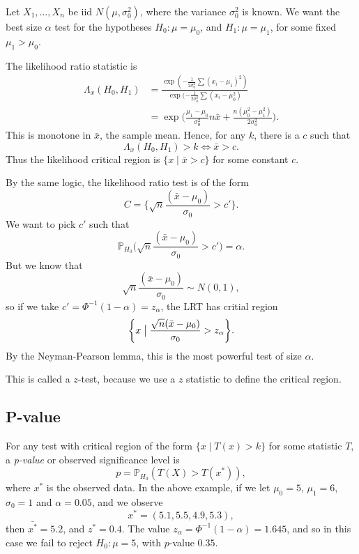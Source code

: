 \documentclass[12pt]{article}
\begin{document}
\begin{exbox}
	Let $X_1, \ldots, X_n$ be iid $N(\mu, \sigma_0^2)$, where the variance $\sigma_0^2$ is known. We want the best size $\alpha$ test for the hypotheses $H_0 : \mu = \mu_0$, and $H_1 : \mu = \mu_1$, for some fixed $\mu_1 > \mu_0$.

	The likelihood ratio statistic is
	\begin{align*}
		\Lambda_x(H_0,H_1) &= \frac{\exp(-\frac{1}{2\sigma_0^2}\sum(x_i - \mu_1)^2)}{\exp(-\frac{1}{2 \sigma_0^2} \sum(x_i - \mu_0^2)} \\
				   &= \exp \biggl( \frac{\mu_1 - \mu_0}{\sigma_0^2} n \bar x + \frac{n(\mu_0^2 - \mu_1^2)}{2 \sigma_0^2} \biggr).
	\end{align*}
	This is monotone in $\bar x$, the sample mean. Hence, for any $k$, there is a $c$ such that
	\[
	\Lambda_x (H_0, H_1) > k \iff \bar x > c
	.\]
	Thus the likelihood critical region is $\{x \mid \bar x > c\}$ for some constant $c$.

	By the same logic, the likelihood ratio test is of the form
	\[
		C = \biggl\{ \sqrt n \frac{(\bar x - \mu_0)}{\sigma_0} > c' \biggr\}
	.\]
	We want to pick $c'$ such that
	\[
	\mathbb{P}_{H_0} \biggl( \sqrt n \frac{(\bar x - \mu_0)}{\sigma_0} > c') = \alpha
	.\]
	But we know that
	\[
	\sqrt n \frac{(\bar x - \mu_0)}{\sigma_0} \sim N(0, 1)
	,\]
	so if we take $c' = \Phi^{-1}(1 - \alpha) = z_{\alpha}$, the LRT has critial region
	\[
		\biggl\{ x \bigm| \frac{\sqrt n (\bar x - \mu_0)}{\sigma_0} > z_{\alpha} \biggr\}
	.\]
	By the Neyman-Pearson lemma, this is the most powerful test of size $\alpha$.

	This is called a $z$-test, because we use a $z$ statistic to define the critical region.
\end{exbox}

\subsection{P-value}
\label{sub:p_value}

For any test with critical region of the form $\{x \mid T(x) > k\}$ for some statistic $T$, a \emph{p-value} or observed significance level is
\[
p = \mathbb{P}_{H_0}(T(X) > T(x^{\ast}))
,\]
where $x^{\ast}$ is the observed data. In the above example, if we let $\mu_0 = 5$, $\mu_1 = 6$, $\sigma_0 = 1$ and $\alpha = 0.05$, and we observe
\[
x^{\ast} = (5.1, 5.5, 4.9, 5.3)
,\]
then $\bar{x^{\ast}} = 5.2$, and $z^{\ast} = 0.4$. The value $z_{\alpha} = \Phi^{-1}(1 - \alpha) = 1.645$, and so in this case we fail to reject $H_0 : \mu = 5$, with $p$-value $0.35$.
\end{document}
